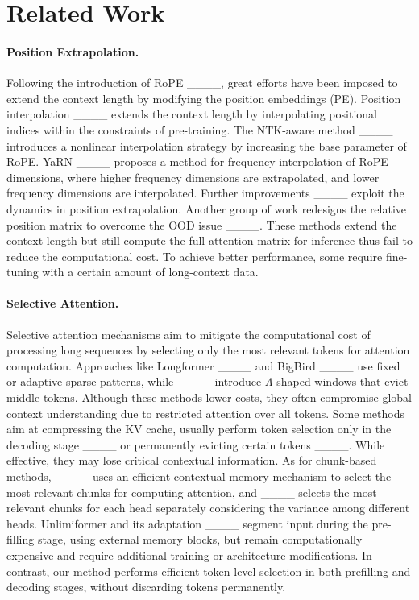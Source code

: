\section{Related Work}
\paragraph{Position Extrapolation.}
Following the introduction of RoPE ____, great efforts have been imposed to extend the context length by modifying the position embeddings (PE).
Position interpolation  ____ extends the context length by interpolating positional indices within the constraints of pre-training. 
The NTK-aware method ____ introduces a nonlinear interpolation strategy by increasing the base parameter of RoPE. YaRN ____ proposes a method for frequency interpolation of RoPE dimensions, where higher frequency dimensions are extrapolated, and lower frequency dimensions are interpolated. Further improvements ____ exploit the dynamics in position extrapolation.
Another group of work redesigns the relative position matrix to overcome the OOD issue ____. 
These methods extend the context length but still compute the full attention matrix for inference thus fail to reduce the computational cost. To achieve better performance, some require fine-tuning with a certain amount of long-context data.

\paragraph{Selective Attention.}
Selective attention mechanisms aim to mitigate the computational cost of processing long sequences by selecting only the most relevant tokens for attention computation. Approaches like Longformer ____ and BigBird ____ use fixed or adaptive sparse patterns, while ____ introduce $\Lambda$-shaped windows that evict middle tokens. Although these methods lower costs, they often compromise global context understanding due to restricted attention over all tokens.
Some methods aim at compressing the KV cache, usually perform token selection only in the decoding stage ____ or permanently evicting certain tokens ____. While effective, they may lose critical contextual information.
As for chunk-based methods, ____ uses an efficient contextual memory mechanism to select the most relevant chunks for computing attention, and ____ selects the most relevant chunks for each head separately considering the variance among different heads.
Unlimiformer and its adaptation ____ segment input during the pre-filling stage, using external memory blocks, but remain computationally expensive and require additional training or architecture modifications.
In contrast, our method performs efficient token-level selection in both prefilling and decoding stages, without discarding tokens permanently.

